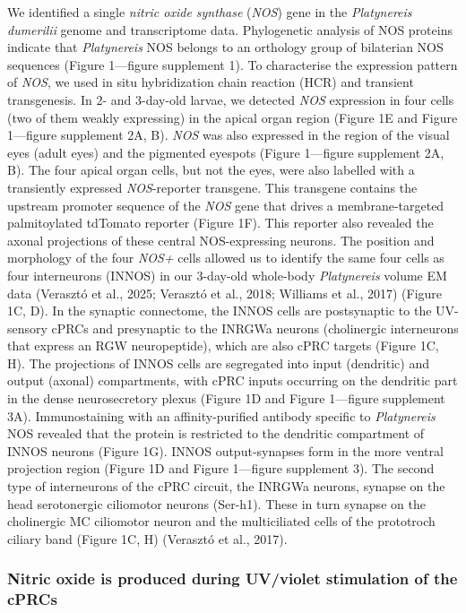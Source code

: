 \documentclass[
  11pt,
  letterpaper,
  DIV=11,
  numbers=noendperiod]{scrartcl}
\begin{document}
We identified a single \emph{nitric oxide synthase} (\emph{NOS}) gene in
the \emph{Platynereis dumerilii} genome and transcriptome data.
Phylogenetic analysis of NOS proteins indicate that \emph{Platynereis}
NOS belongs to an orthology group of bilaterian NOS sequences (Figure
1---figure supplement 1). To characterise the expression pattern of
\emph{NOS}, we used in situ hybridization chain reaction (HCR) and
transient transgenesis. In 2- and 3-day-old larvae, we detected
\emph{NOS} expression in four cells (two of them weakly expressing) in
the apical organ region (Figure 1E and Figure 1---figure supplement 2A,
B). \emph{NOS} was also expressed in the region of the visual eyes
(adult eyes) and the pigmented eyespots (Figure 1---figure supplement
2A, B). The four apical organ cells, but not the eyes, were also
labelled with a transiently expressed \emph{NOS}-reporter transgene.
This transgene contains the upstream promoter sequence of the \emph{NOS}
gene that drives a membrane-targeted palmitoylated tdTomato reporter
(Figure 1F). This reporter also revealed the axonal projections of these
central NOS-expressing neurons. The position and morphology of the four
\emph{NOS+} cells allowed us to identify the same four cells as four
interneurons (INNOS) in our 3-day-old whole-body \emph{Platynereis}
volume EM data (Verasztó et al., 2025; Verasztó et al., 2018; Williams
et al., 2017) (Figure 1C, D). In the synaptic connectome, the INNOS
cells are postsynaptic to the UV-sensory cPRCs and presynaptic to the
INRGWa neurons (cholinergic interneurons that express an RGW
neuropeptide), which are also cPRC targets (Figure 1C, H). The
projections of INNOS cells are segregated into input (dendritic) and
output (axonal) compartments, with cPRC inputs occurring on the
dendritic part in the dense neurosecretory plexus (Figure 1D and Figure
1---figure supplement 3A). Immunostaining with an affinity-purified
antibody specific to \emph{Platynereis} NOS revealed that the protein is
restricted to the dendritic compartment of INNOS neurons (Figure 1G).
INNOS output-synapses form in the more ventral projection region (Figure
1D and Figure 1---figure supplement 3). The second type of interneurons
of the cPRC circuit, the INRGWa neurons, synapse on the head
serotonergic ciliomotor neurons (Ser-h1). These in turn synapse on the
cholinergic MC ciliomotor neuron and the multiciliated cells of the
prototroch ciliary band (Figure 1C, H) (Verasztó et al., 2017).

\subsubsection{Nitric oxide is produced during UV/violet stimulation of
the
cPRCs}\label{nitric-oxide-is-produced-during-uvviolet-stimulation-of-the-cprcs}
\end{document}
